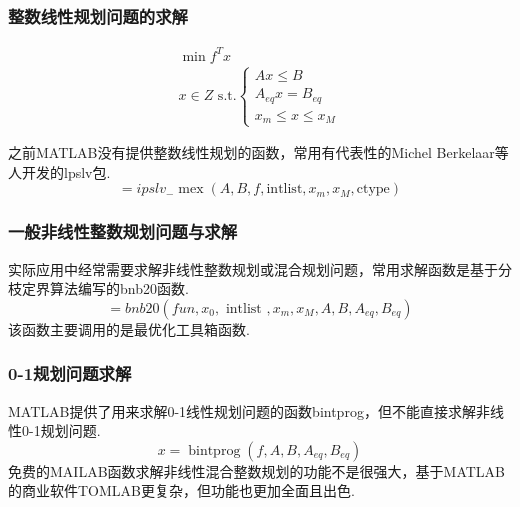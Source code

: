 \documentclass[10pt]{beamer}
\begin{document}
  \begin{frame}[allowframebreaks]
  \frametitle{整数线性规划问题的求解}
  
  \begin{equation}
  \begin{array}{c}
  \min f^{T} x \\
  x \in Z \text { s.t.}\left\{\begin{array}{c}
  A x \leq B \\
  A_{e q} x=B_{e q} \\
  x_{m} \leq x \leq x_{M}
  \end{array}\right.
  \end{array}
  \end{equation}
  
  之前MATLAB没有提供整数线性规划的函数，常用有代表性的Michel Berkelaar等人开发的lpslv包.
  \begin{equation}
  [x, h o w]=i p s l v_{-} \operatorname{mex}\left(A, B, f, \text {intlist}, x_{m}, x_{M}, \text {ctype}\right)
  \end{equation}
  \end{frame}
  
  \begin{frame}[allowframebreaks]
  \frametitle{一般非线性整数规划问题与求解}
  
  实际应用中经常需要求解非线性整数规划或混合规划问题，常用求解函数是基于分枝定界算法编写的bnb20函数.
  \begin{equation}
  [e r r, f, x]=b n b 20\left(f u n, x_{0}, \text { intlist }, x_{m}, x_{M}, A, B, A_{e q}, B_{e q}\right)
  \end{equation}
  该函数主要调用的是最优化工具箱函数.
  \end{frame}
  
  \begin{frame}[allowframebreaks]
  \frametitle{0-1规划问题求解}
  
  MATLAB提供了用来求解0-1线性规划问题的函数bintprog，但不能直接求解非线性0-1规划问题.
  \begin{equation}
  x=\operatorname{bintprog}\left(f, A, B, A_{e q}, B_{e q}\right)
  \end{equation}
  免费的MAILAB函数求解非线性混合整数规划的功能不是很强大，基于MATLAB的商业软件TOMLAB更复杂，但功能也更加全面且出色.
  \end{frame}
  
\end{document}
